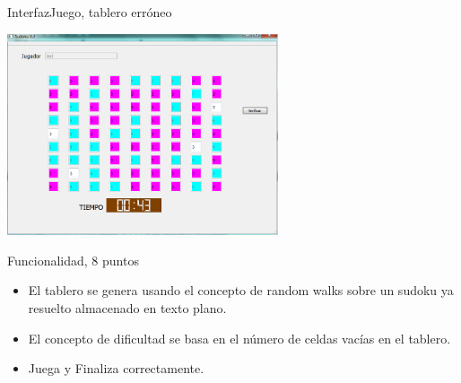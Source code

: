 \documentclass[9pt]{beamer}
\begin{document}
	\begin{frame}{Interfaz}{Juego, tablero erróneo}
		\begin{center}
			\includegraphics[width =0.60\textwidth]{juego2.png}
		\end{center}
	\end{frame}	
	
	
	

	\begin{frame}{Funcionalidad, 8 puntos}
		\begin{itemize}
			\item El tablero se genera usando el concepto de random walks sobre un sudoku ya resuelto almacenado en texto plano.
			\item El concepto de dificultad se basa en el número de celdas vacías en el tablero.
			\item Juega y Finaliza correctamente.
		\end{itemize}
	\end{frame}
	
\end{document}
